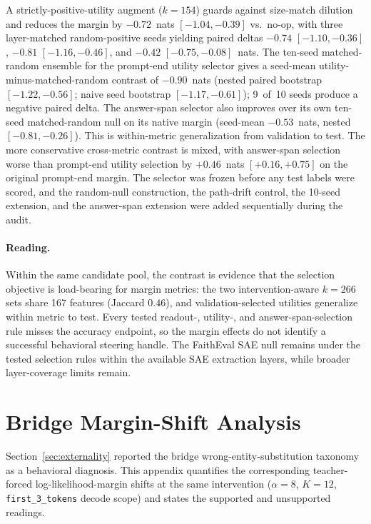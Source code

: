 \documentclass{article}
\begin{document}
A strictly-positive-utility augment ($k = 154$) guards against size-match dilution and reduces the margin by $-0.72$~nats $[-1.04, -0.39]$ vs.\ no-op, with three layer-matched random-positive seeds yielding paired deltas $-0.74$ $[-1.10, -0.36]$, $-0.81$ $[-1.16, -0.46]$, and $-0.42$ $[-0.75, -0.08]$~nats.
The ten-seed matched-random ensemble for the prompt-end utility selector gives a seed-mean utility-minus-matched-random contrast of $-0.90$~nats (nested paired bootstrap $[-1.22, -0.56]$; naive seed bootstrap $[-1.17, -0.61]$); 9~of~10 seeds produce a negative paired delta.
The answer-span selector also improves over its own ten-seed matched-random null on its native margin (seed-mean $-0.53$~nats, nested $[-0.81, -0.26]$).
This is within-metric generalization from validation to test.
The more conservative cross-metric contrast is mixed, with answer-span selection worse than prompt-end utility selection by $+0.46$~nats $[+0.16, +0.75]$ on the original prompt-end margin.
The selector was frozen before any test labels were scored, and the random-null construction, the path-drift control, the 10-seed extension, and the answer-span extension were added sequentially during the audit.

\paragraph{Reading.}
Within the same candidate pool, the contrast is evidence that the selection objective is load-bearing for margin metrics: the two intervention-aware $k=266$ sets share 167 features (Jaccard $0.46$), and validation-selected utilities generalize within metric to test.
Every tested readout-, utility-, and answer-span-selection rule misses the accuracy endpoint, so the margin effects do not identify a successful behavioral steering handle.
The FaithEval SAE null remains under the tested selection rules within the available SAE extraction layers, while broader layer-coverage limits remain.
\FloatBarrier

\section{Bridge Margin-Shift Analysis}
\label{app:bridge_margin}

Section~\ref{sec:externality} reported the bridge wrong-entity-substitution taxonomy as a behavioral diagnosis.
This appendix quantifies the corresponding teacher-forced log-likelihood-margin shifts at the same intervention ($\alpha = 8$, $K = 12$, \texttt{first\_3\_tokens} decode scope) and states the supported and unsupported readings.
\end{document}
